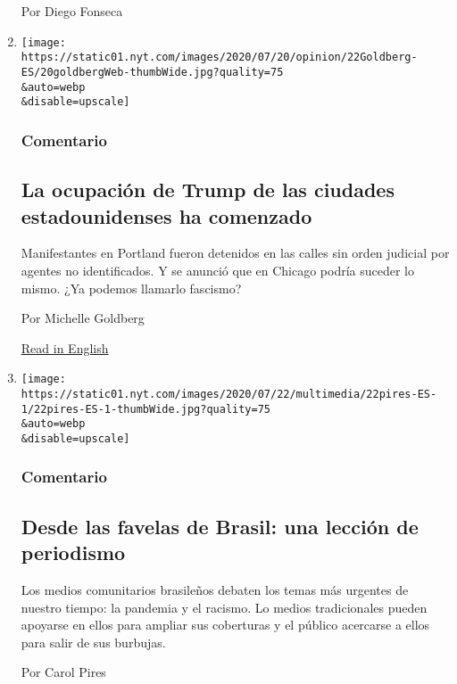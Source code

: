 \begin{enumerate}
  Por Diego Fonseca
\item
  \href{/es/2020/07/22/espanol/opinion/portland-protestas-trump.html}{}

  \texttt{[image: https://static01.nyt.com/images/2020/07/20/opinion/22Goldberg-ES/20goldbergWeb-thumbWide.jpg?quality=75\\\&auto=webp\\\&disable=upscale]}

  \hypertarget{comentario-11}{%
  \subsubsection{Comentario}\label{comentario-11}}

  \hypertarget{la-ocupaciuxf3n-de-trump-de-las-ciudades-estadounidenses-ha-comenzado}{%
  \subsection{La ocupación de Trump de las ciudades estadounidenses ha
  comenzado}\label{la-ocupaciuxf3n-de-trump-de-las-ciudades-estadounidenses-ha-comenzado}}

  Manifestantes en Portland fueron detenidos en las calles sin orden
  judicial por agentes no identificados. Y se anunció que en Chicago
  podría suceder lo mismo. ¿Ya podemos llamarlo fascismo?

  Por Michelle Goldberg

  \href{https://www.nytimes.com/2020/07/20/opinion/portland-protests-trump.html}{Read
  in English}
\item
  \href{/es/2020/07/22/espanol/opinion/periodismo-brasil-favelas.html}{}

  \texttt{[image: https://static01.nyt.com/images/2020/07/22/multimedia/22pires-ES-1/22pires-ES-1-thumbWide.jpg?quality=75\\\&auto=webp\\\&disable=upscale]}

  \hypertarget{comentario-12}{%
  \subsubsection{Comentario}\label{comentario-12}}

  \hypertarget{desde-las-favelas-de-brasil-una-lecciuxf3n-de-periodismo}{%
  \subsection{Desde las favelas de Brasil: una lección de
  periodismo}\label{desde-las-favelas-de-brasil-una-lecciuxf3n-de-periodismo}}

  Los medios comunitarios brasileños debaten los temas más urgentes de
  nuestro tiempo: la pandemia y el racismo. Lo medios tradicionales
  pueden apoyarse en ellos para ampliar sus coberturas y el público
  acercarse a ellos para salir de sus burbujas.

  Por Carol Pires
\end{enumerate}

